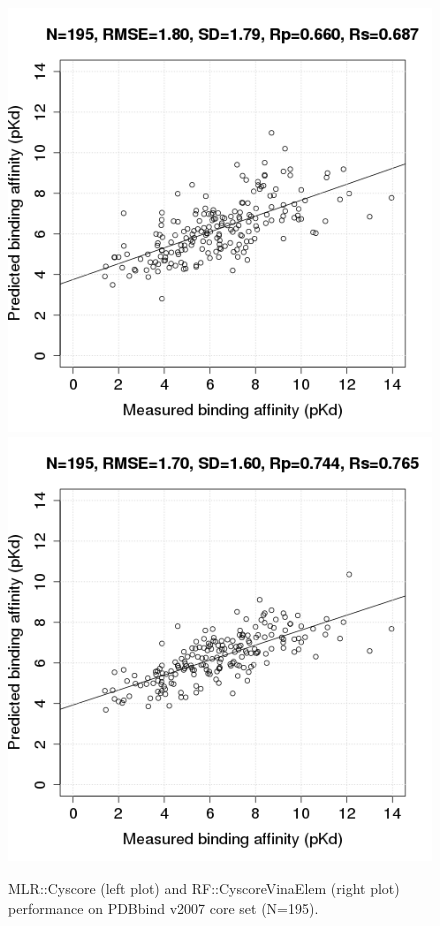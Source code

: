 \documentclass[10pt,conference,compsocconf]{IEEEtran}
\begin{document}
\begin{figure}
\includegraphics[width=1.37\linewidth,natwidth=480,natheight=480]{../rfcyscore/x4/mlr/trn-247-tst-195-yp.png}
\endminipage
{}
\includegraphics[width=1.37\linewidth,natwidth=480,natheight=480]{../rfcyscore/x46/rf/trn-2280-tst-195-yp.png}
\endminipage
\caption{MLR::Cyscore (left plot) and RF::CyscoreVinaElem (right plot) performance on PDBbind v2007 core set (N=195).}
\label{fig:tst195}
\end{figure}
\end{document}
